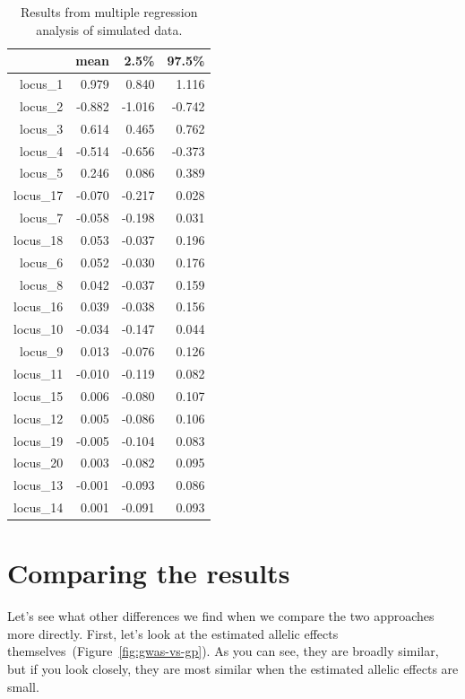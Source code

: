 \documentclass[12pt]{article}
\begin{document}
\begin{table}
\centering
\begin{tabular}{rrrr}
  \hline
 & mean & 2.5\% & 97.5\% \\ 
  \hline
locus\_1  & 0.979  & 0.840  & 1.116 \\
locus\_2  & -0.882 & -1.016 & -0.742 \\
locus\_3  & 0.614 &  0.465  & 0.762 \\
locus\_4  & -0.514 & -0.656 & -0.373 \\
locus\_5  & 0.246  & 0.086  & 0.389 \\
locus\_17 & -0.070 & -0.217 & 0.028 \\
locus\_7  & -0.058 & -0.198 & 0.031 \\
locus\_18 & 0.053  & -0.037 & 0.196 \\
locus\_6  & 0.052  & -0.030 & 0.176 \\
locus\_8  & 0.042  & -0.037 & 0.159 \\
locus\_16 & 0.039  & -0.038 & 0.156 \\
locus\_10 & -0.034 & -0.147 & 0.044 \\
locus\_9  & 0.013  & -0.076 & 0.126 \\
locus\_11 & -0.010 & -0.119 & 0.082 \\
locus\_15 & 0.006  & -0.080 & 0.107 \\
locus\_12 & 0.005  & -0.086 & 0.106 \\
locus\_19 & -0.005 & -0.104 & 0.083 \\
locus\_20 & 0.003  & -0.082 & 0.095 \\
locus\_13 & -0.001 & -0.093 & 0.086 \\
locus\_14 & 0.001  & -0.091 & 0.093 \\
  \hline
\end{tabular}
\caption{Results from multiple regression analysis of simulated
  data.}\label{table:multiple} 
\end{table}

\section*{Comparing the results}

Let's see what other differences we find when we compare the two
approaches more directly. First, let's look at the estimated allelic
effects themselves~(Figure~\ref{fig:gwas-vs-gp}). As you can see, they
are broadly similar, but if you look closely, they are most similar
when the estimated allelic effects are small.
\end{document}
